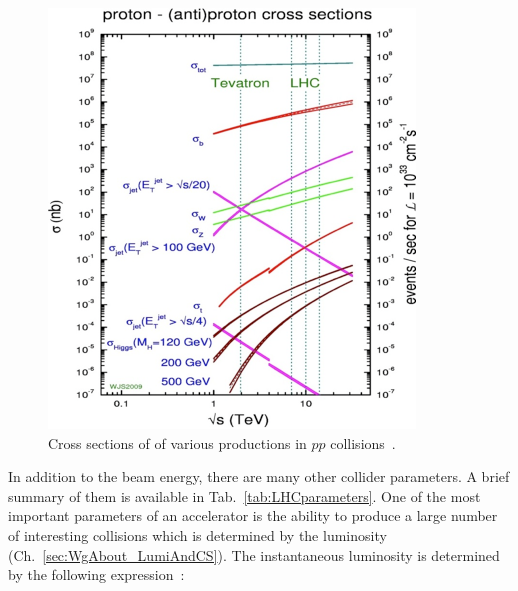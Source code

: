 \begin{figure}
  \centering
  \includegraphics[width=.95\linewidth]{../figs/Exp/LHC_totalCS.png}
  \caption{Cross sections of of various productions in $pp$ collisions~\cite{ref_fig_LHC_totalCS}.}
  \label{fig:LHC_totalCS}
\end{figure}



In addition to the beam energy, there are many other collider parameters. A brief summary of them is available in Tab.~\ref{tab:LHCparameters}. One of the most important parameters of an accelerator is the ability to produce a large number of interesting collisions which is determined by the luminosity (Ch.~\ref{sec:WgAbout_LumiAndCS}). The instantaneous luminosity is determined by the following expression~\cite{ref_PDG}:

